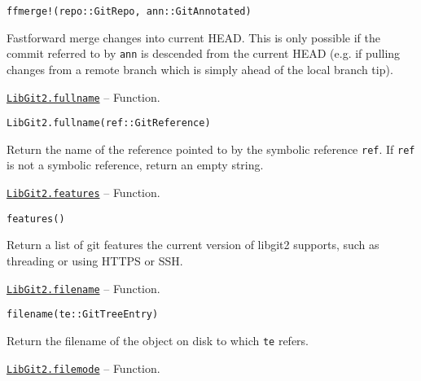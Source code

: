 \begin{adjustwidth}{2em}{0pt}


\begin{verbatim}
ffmerge!(repo::GitRepo, ann::GitAnnotated)
\end{verbatim}

Fastforward merge changes into current HEAD. This is only possible if the commit referred to by \texttt{ann} is descended from the current HEAD (e.g. if pulling changes from a remote branch which is simply ahead of the local branch tip).



\end{adjustwidth}
\hypertarget{2268784022172298907}{}
\hyperlink{2268784022172298907}{\texttt{LibGit2.fullname}}  -- {Function.}

\begin{adjustwidth}{2em}{0pt}


\begin{verbatim}
LibGit2.fullname(ref::GitReference)
\end{verbatim}

Return the name of the reference pointed to by the symbolic reference \texttt{ref}. If \texttt{ref} is not a symbolic reference, return an empty string.



\end{adjustwidth}
\hypertarget{15490475873131507647}{}
\hyperlink{15490475873131507647}{\texttt{LibGit2.features}}  -- {Function.}

\begin{adjustwidth}{2em}{0pt}


\begin{verbatim}
features()
\end{verbatim}

Return a list of git features the current version of libgit2 supports, such as threading or using HTTPS or SSH.



\end{adjustwidth}
\hypertarget{4260849105857148209}{}
\hyperlink{4260849105857148209}{\texttt{LibGit2.filename}}  -- {Function.}

\begin{adjustwidth}{2em}{0pt}


\begin{verbatim}
filename(te::GitTreeEntry)
\end{verbatim}

Return the filename of the object on disk to which \texttt{te} refers.



\end{adjustwidth}
\hypertarget{10756827966829509667}{}
\hyperlink{10756827966829509667}{\texttt{LibGit2.filemode}}  -- {Function.}

